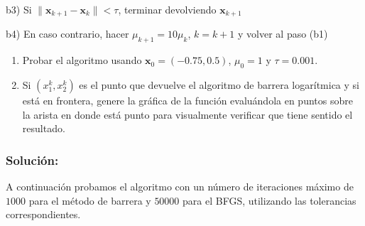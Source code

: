 \documentclass[11pt]{article}
\begin{document}
b3) Si \(\|\mathbf{x}_{k+1} - \mathbf{x}_k\|<\tau\), terminar
devolviendo \(\mathbf{x}_{k+1}\)

b4) En caso contrario, hacer \(\mu_{k+1} = 10\mu_k\), \(k=k+1\) y volver
al paso (b1)

\begin{enumerate}
\def\labelenumi{\arabic{enumi}.}
\setcounter{enumi}{2}
\item
  Probar el algoritmo usando \(\mathbf{x}_0 = (-0.75, 0.5)\),
  \(\mu_0=1\) y \(\tau=0.001\).
\item
  Si \((x_1^{k}, x_2^k)\) es el punto que devuelve el algoritmo de
  barrera logarítmica y si está en frontera, genere la gráfica de la
  función evaluándola en puntos sobre la arista en donde está punto para
  visualmente verificar que tiene sentido el resultado.
\end{enumerate}

\hypertarget{soluciuxf3n}{%
\subsubsection{Solución:}\label{soluciuxf3n}}

    A continuación probamos el algoritmo con un número de iteraciones máximo
de \(1000\) para el método de barrera y \(50000\) para el BFGS,
utilizando las tolerancias correspondientes.
\end{document}
